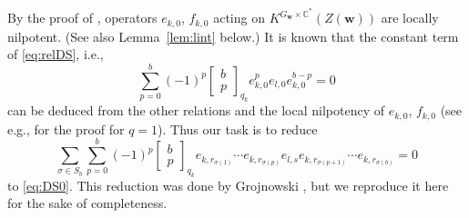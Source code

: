 \documentclass[12pt]{amsart}
\def\Bbb{\mathbb}
\theoremstyle{definition}
\theoremstyle{remark}
\numberwithin{equation}{subsection}
\newcommand{\lemref}[1]{Lemma~\ref{#1}}
\newcommand{\C}{{\Bbb C}}
\newcommand{\bw}{{\mathbf w}} %
\newcommand{\Zw}{Z(\bw)}
\begin{document}
By the proof of \cite[9.3]{Na-alg}, operators $e_{k,0}$, $f_{k,0}$
acting on $K^{G_\bw\times\C^*}(\Zw)$ are locally nilpotent. (See also
\lemref{lem:lint} below.) It is known that the constant term of
\eqref{eq:relDS}, i.e.,
\begin{equation}\label{eq:DS0}
\sum_{p=0}^{b}(-1)^p \begin{bmatrix} b \\ p\end{bmatrix}_{q_k}
                     e_{k,0}^p e_{l,0} e_{k,0}^{b-p} = 0
\end{equation}
can be deduced from the other relations and the local nilpotency of
$e_{k,0}$, $f_{k,0}$ (see e.g., \cite[4.3.2]{Gi-book} for the proof
for $q = 1$). Thus our task is to reduce 
\begin{equation}\label{eq:genDS}
  \sum_{\sigma\in S_b}
   \sum_{p=0}^{b}(-1)^p 
   \begin{bmatrix} b \\ p\end{bmatrix}_{q_k}
   e_{k,r_{\sigma(1)}}\cdots e_{k, r_{\sigma(p)}} e_{l,s}
   e_{k, r_{\sigma(p+1)}}\cdots e_{k,r_{\sigma(b)}} = 0
\end{equation}
to \eqref{eq:DS0}.
%
This reduction was done by Grojnowski \cite{Gr_aff}, but we reproduce
it here for the sake of completeness.
\end{document}
